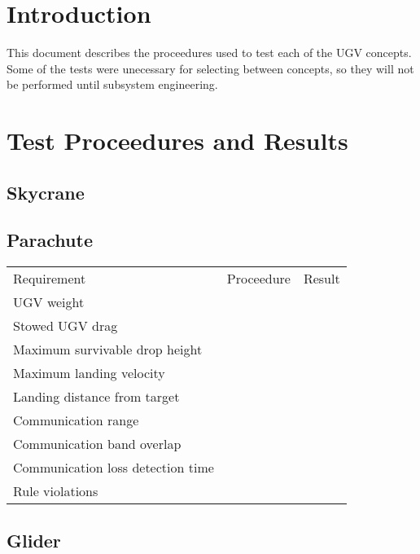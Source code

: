 \documentclass[]{auvsi_doc}
\begin{document}
\begin{AUVSITitlePage}
\begin{artifacttable}
\end{artifacttable}
\end{AUVSITitlePage}

\section{Introduction}
This document describes the proceedures used to test each of the UGV concepts.
Some of the tests were unecessary for selecting between concepts, so they will not be performed until subsystem engineering.

\section {Test Proceedures and Results}
\subsection{Skycrane}

\subsection{Parachute}
\begin{table}[]
	\begin{tabular}{lll}
	Requirement                    & Proceedure & Result \\
	UGV weight                     &            &        \\
	Stowed UGV drag                &            &        \\
	Maximum survivable drop height &            &        \\
	Maximum landing velocity       &            &        \\
	Landing distance from target   &            &        \\
	Communication range            &            &        \\
	Communication band overlap     &            &        \\
	Communication loss detection time &            &     \\   
	Rule violations                &            &        
	\end{tabular}
\end{table}

\subsection{Glider}
\end{document}
